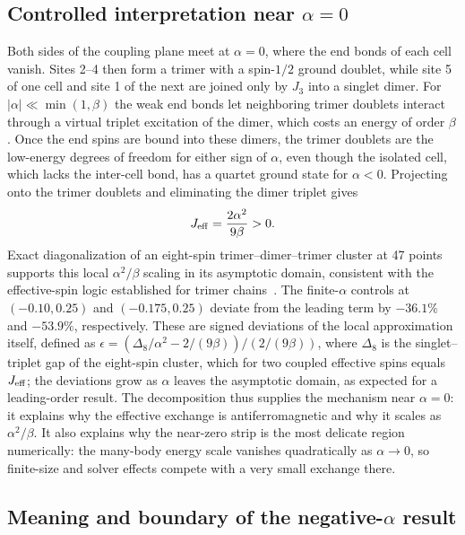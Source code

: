 \subsection{Controlled interpretation near \texorpdfstring{$\alpha=0$}{alpha=0}}

Both sides of the coupling plane meet at $\alpha=0$, where the end bonds of each
cell vanish.
Sites 2--4 then form a trimer with a spin-$1/2$ ground doublet, while site 5 of
one cell and site 1 of the next are joined only by $J_3$ into a singlet dimer.
For $|\alpha|\ll\min(1,\beta)$ the weak end bonds let neighboring trimer doublets
interact through a virtual triplet excitation of the dimer, which costs an energy
of order $\beta$.
Once the end spins are bound into these dimers, the trimer doublets are the
low-energy degrees of freedom for either sign of $\alpha$, even though the isolated
cell, which lacks the inter-cell bond, has a quartet ground state for $\alpha<0$.
Projecting onto the trimer doublets and eliminating the dimer triplet gives
\begin{equation}
J_{\mathrm{eff}}=\frac{2\alpha^2}{9\beta}>0 .
\label{eq:near-zero}
\end{equation}
Exact diagonalization of an eight-spin trimer--dimer--trimer cluster at 47 points
supports this
local $\alpha^2/\beta$ scaling in its asymptotic domain, consistent with the
effective-spin logic established for trimer
chains~\cite{cheng2022trimer,cheng2024trimerfield}.
The finite-$\alpha$ controls at $(-0.10,0.25)$ and $(-0.175,0.25)$ deviate from the
leading term by $-36.1\%$ and $-53.9\%$, respectively.
These are signed deviations of the local approximation itself, defined as
$\epsilon=(\Delta_8/\alpha^2-2/(9\beta))/(2/(9\beta))$, where $\Delta_8$ is the
singlet--triplet gap of the eight-spin cluster, which for two coupled effective
spins equals $J_{\mathrm{eff}}$; the deviations grow as
$\alpha$ leaves the asymptotic domain, as expected for a leading-order result.
The decomposition thus supplies the mechanism near $\alpha=0$: it explains why the
effective exchange is antiferromagnetic and why it scales as $\alpha^2/\beta$.
It also explains why the near-zero strip is the most delicate region numerically:
the many-body energy scale vanishes quadratically as $\alpha\to0$, so finite-size
and solver effects compete with a very small exchange there.

\subsection{Meaning and boundary of the negative-\texorpdfstring{$\alpha$}{alpha} result}
\label{sec:negative-boundary}

